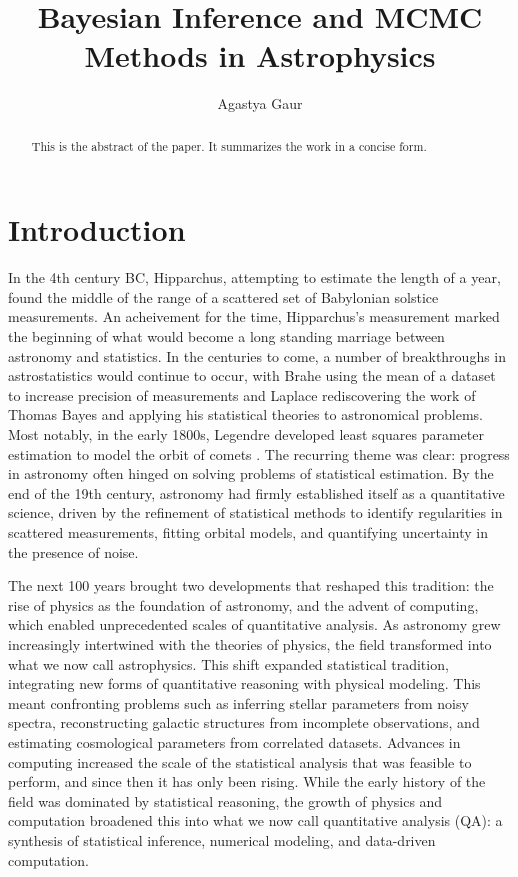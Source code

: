 \documentclass[preprint2,linenumbers,longauthor]{aastex631}
\begin{document}
\label{placeholder} %

\title{Bayesian Inference and MCMC Methods in Astrophysics}
\author{Agastya Gaur}

\begin{abstract}
  This is the abstract of the paper. It summarizes the work in a concise form.
\end{abstract}

\tableofcontents

\section{Introduction}
\label{sec:Introduction} %
In the 4th century BC, Hipparchus, attempting to estimate the length of a year, found the middle of the range of a scattered set of Babylonian solstice measurements. An acheivement for the time, Hipparchus's measurement marked the beginning of what would become a long standing marriage between astronomy and statistics. In the centuries to come, a number of breakthroughs in astrostatistics would continue to occur, with Brahe using the mean of a dataset to increase precision of measurements and Laplace rediscovering the work of Thomas Bayes and applying his statistical theories to astronomical problems. Most notably, in the early 1800s, Legendre developed least squares parameter estimation to model the orbit of comets \citep{feigelsonStatisticalChallengesModern2004}. The recurring theme was clear: progress in astronomy often hinged on solving problems of statistical estimation. By the end of the 19th century, astronomy had firmly established itself as a quantitative science, driven by the refinement of statistical methods to identify regularities in scattered measurements, fitting orbital models, and quantifying uncertainty in the presence of noise.

The next 100 years brought two developments that reshaped this tradition: the rise of physics as the foundation of astronomy, and the advent of computing, which enabled unprecedented scales of quantitative analysis. As astronomy grew increasingly intertwined with the theories of physics, the field transformed into what we now call astrophysics. This shift expanded statistical tradition, integrating new forms of quantitative reasoning with physical modeling. This meant confronting problems such as inferring stellar parameters from noisy spectra, reconstructing galactic structures from incomplete observations, and estimating cosmological parameters from correlated datasets. Advances in computing increased the scale of the statistical analysis that was feasible to perform, and since then it has only been rising. While the early history of the field was dominated by statistical reasoning, the growth of physics and computation broadened this into what we now call quantitative analysis (QA): a synthesis of statistical inference, numerical modeling, and data-driven computation.
\end{document}
